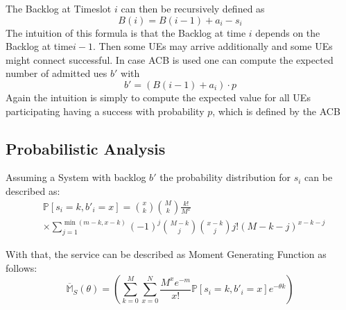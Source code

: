 \documentclass[conference]{IEEEtran}
\begin{document}
The Backlog at Timeslot $i$ can then be recursively defined as
\[B(i) = B(i-1)+a_i-s_i\]
The intuition of this formula is that the Backlog at time $i$ depends on the Backlog at time$i-1$.
Then some UEs may arrive additionally and some UEs might connect successful.
In case ACB is used one can compute the expected number of admitted ues $b'$ with \[b'= (B(i-1)+a_i)\cdot p
\]
Again the intuition is simply to compute the expected value for all UEs participating having a success with probability $p$, which is defined by the ACB
\subsection{Probabilistic Analysis}
Assuming a System with backlog $b'$ the probability distribution for $s_i$ can be described as:
\begin{align*}
    &\mathds{P}[s_i = k, b'_i = x]= \binom{x}{k}\binom{M}{k}\frac{k!}{M^x}\\
    &\times\sum_{j= 1}^{\min(m-k, x-k)} (-1)^j\binom{M-k}{j}\binom{x-k}{j}j! (M-k-j)^{x-k-j}
\end{align*}

With that, the service can be described as Moment Generating Function as follows:
\[\overline{\mathds{M}}_S(\theta) = \left(\sum_{k = 0}^{M}\sum_{x =0}^{N}\frac{M^xe^{-m}}{x!}\mathds{P}[s_i = k, b'_i = x]e^{-\theta k}  \right)\]
\end{document}
